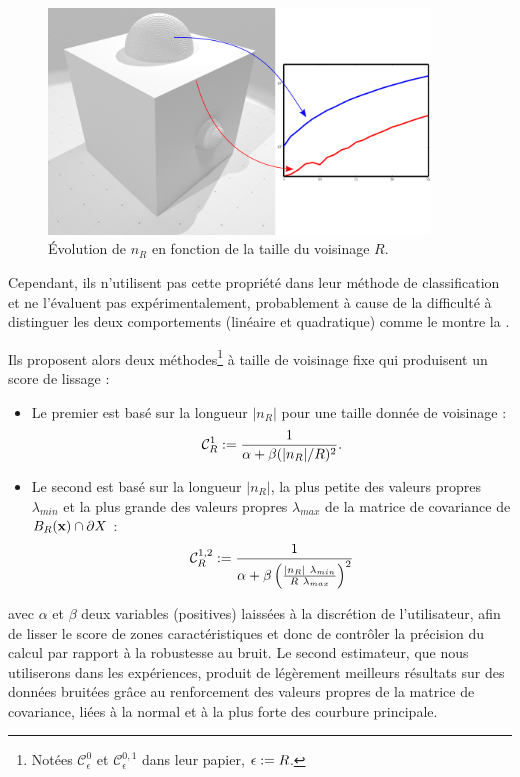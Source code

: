 \begin{figure}[ht]{
    \begin{center}
    \includegraphics[height=6cm]{figures/CubeSpherePlotMoment_SS}
    \end{center}}
    \caption[Évolution de $n_R$ en fonction de la taille du voisinage $R$]{Évolution de $n_R$ en fonction de la taille du voisinage $R$.
      \label{fig:moment-multiscale}}
\end{figure}

Cependant, ils n'utilisent pas cette propriété dans leur méthode de
classification et ne l'évaluent pas expérimentalement, probablement à cause de
la difficulté à distinguer les deux comportements (linéaire et quadratique)
comme le montre la .


Ils proposent alors deux méthodes\footnote{Notées $\mathcal{C}_{\epsilon}^{0}$
et $\mathcal{C}_{\epsilon}^{0,1}$ dans leur papier, $\epsilon := R$.} à taille de
voisinage fixe qui produisent un score de lissage :
%
\begin{itemize}
%
  \item Le premier est basé sur la longueur $|n_R|$ pour une taille donnée de
  voisinage :
  \begin{equation}
    \mathcal{C}_{R}^{1} := \frac{1}{\alpha + \beta(|n_R|/R)^2} .
    \label{eq:moment-C0}
  \end{equation}
%
  \item Le second est basé sur la longueur $|n_R|$, la plus petite des valeurs
  propres $\lambda_{min}$ et la plus grande des valeurs propres $\lambda_{max}$
  de la matrice de covariance de $B_{R}(\mathbf{x}) \cap \partial X$ :
  \begin{equation}
    \mathcal{C}_{R}^{1,2} := \frac{1}{\alpha + \beta
    \left( \frac{|n_R|~\lambda_{min}}{R~\lambda_{max}} \right)^2}
    \label{eq:moment-C1}
  \end{equation}
%
\end{itemize}
%
avec $\alpha$ et $\beta$ deux variables (positives) laissées à la discrétion de
l'utilisateur, afin de lisser le score de zones caractéristiques et donc de
contrôler la précision du calcul par rapport à la robustesse au bruit. Le second
estimateur, que nous utiliserons dans les expériences, produit de légèrement
meilleurs résultats sur des données bruitées grâce au renforcement des valeurs
propres de la matrice de covariance, liées à la normal et à la plus forte des
courbure principale.
%


